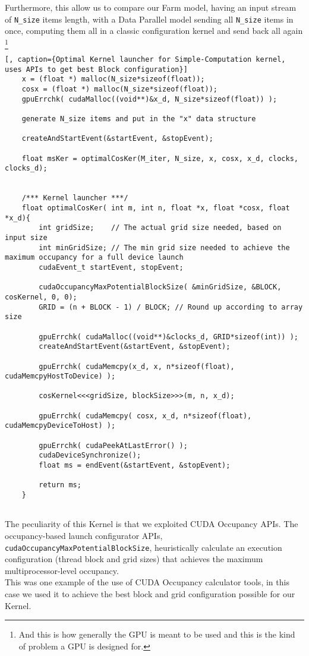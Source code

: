 	Furthermore, this allow us to compare our Farm model, having an input stream of \texttt{N\_size} items length, with a Data Parallel model sending all \texttt{N\_size} items in once, computing them all in a classic configuration kernel and send back all again \footnote{And this is how generally the GPU is meant to be used and this is the kind of problem a GPU is designed for.}
	\begin{lstlisting}[, caption={Optimal Kernel launcher for Simple-Computation kernel, uses APIs to get best Block configuration}]
	x = (float *) malloc(N_size*sizeof(float));
	cosx = (float *) malloc(N_size*sizeof(float));
	gpuErrchk( cudaMalloc((void**)&x_d, N_size*sizeof(float)) );
	
	generate N_size items and put in the "x" data structure
	
	createAndStartEvent(&startEvent, &stopEvent);
	
	float msKer = optimalCosKer(M_iter, N_size, x, cosx, x_d, clocks, clocks_d); 	
	
	
	/*** Kernel launcher ***/
	float optimalCosKer( int m, int n, float *x, float *cosx, float *x_d){
		int gridSize;    // The actual grid size needed, based on input size 
		int minGridSize; // The min grid size needed to achieve the maximum occupancy for a full device launch 
		cudaEvent_t startEvent, stopEvent;
		
		cudaOccupancyMaxPotentialBlockSize( &minGridSize, &BLOCK, cosKernel, 0, 0); 
		GRID = (n + BLOCK - 1) / BLOCK; // Round up according to array size 

		gpuErrchk( cudaMalloc((void**)&clocks_d, GRID*sizeof(int)) );  		
		createAndStartEvent(&startEvent, &stopEvent); 
		  
		gpuErrchk( cudaMemcpy(x_d, x, n*sizeof(float), cudaMemcpyHostToDevice) ); 
		
		cosKernel<<<gridSize, blockSize>>>(m, n, x_d);
		
		gpuErrchk( cudaMemcpy( cosx, x_d, n*sizeof(float), cudaMemcpyDeviceToHost) );
	
		gpuErrchk( cudaPeekAtLastError() );		
		cudaDeviceSynchronize();		
		float ms = endEvent(&startEvent, &stopEvent);
	
		return ms;	
	}
		
	\end{lstlisting}
	The peculiarity of this Kernel is that we exploited CUDA Occupancy APIs.
	The occupancy-based launch configurator APIs,
	\texttt{cudaOccupancyMaxPotentialBlockSize}, heuristically calculate an execution configuration (thread block and grid sizes) that achieves the maximum multiprocessor-level occupancy.\\
	This was one example of the use of CUDA Occupancy calculator tools, in this case we used it to achieve the best block and grid configuration possible for our Kernel.
	
